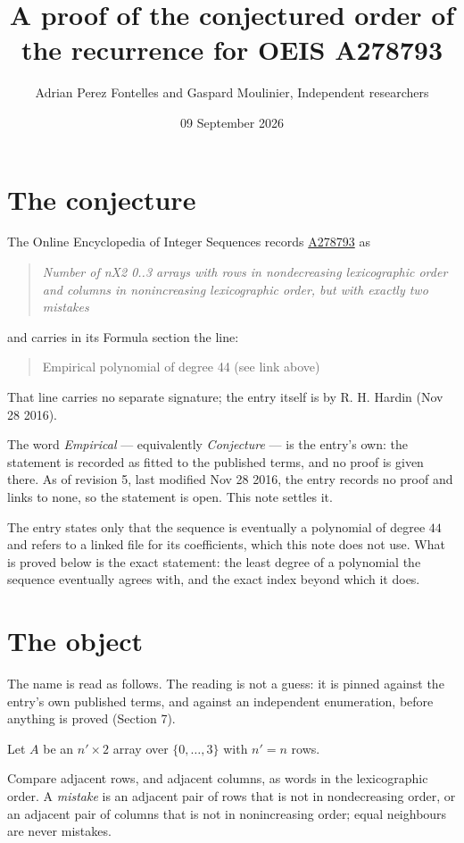 \documentclass[11pt]{article}
\title{A proof of the conjectured order of the recurrence for OEIS A278793}
\author{Adrian Perez Fontelles and Gaspard Moulinier, Independent researchers}
\date{09 September 2026}
\theoremstyle{definition}
\begin{document}
\maketitle
\section{The conjecture}

The Online Encyclopedia of Integer Sequences records \href{https://oeis.org/A278793}{A278793} as

\begin{quote}\itshape Number of nX2 0..3 arrays with rows in nondecreasing lexicographic order and columns in nonincreasing lexicographic order, but with exactly two mistakes\end{quote}

and carries in its Formula section the line:

\begin{quote}\ttfamily Empirical polynomial of degree 44 (see link above)\end{quote}

That line carries no separate signature; the entry itself is by R. H. Hardin (Nov 28 2016).

The word {\itshape Empirical} --- equivalently {\itshape Conjecture} --- is the entry's own: the statement is recorded as fitted to the published terms, and no proof is given there. As of revision 5, last modified Nov 28 2016, the entry records no proof and links to none, so the statement is open. This note settles it.

The entry states only that the sequence is eventually a polynomial of degree $44$ and refers to a linked file for its coefficients, which this note does not use. What is proved below is the exact statement: the least degree of a polynomial the sequence eventually agrees with, and the exact index beyond which it does.

\section{The object}

The name is read as follows. The reading is not a guess: it is pinned against the entry's own published terms, and against an independent enumeration, before anything is proved (Section 7).

Let $A$ be an $n' \times 2$ array over $\{0,\dots,3\}$ with $n' = n$ rows.

Compare adjacent rows, and adjacent columns, as words in the lexicographic order. A {\itshape mistake} is an adjacent pair of rows that is not in nondecreasing order, or an adjacent pair of columns that is not in nonincreasing order; equal neighbours are never mistakes.
\end{document}
